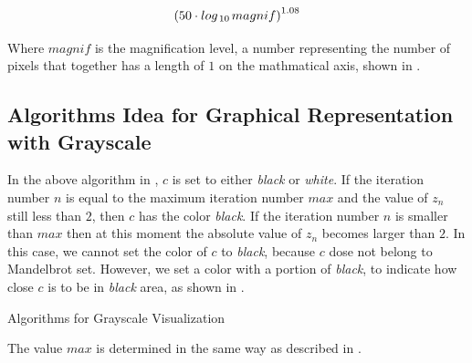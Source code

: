 \begin{equation}
    \label{eq:max}
    {(50 \cdot log_{\thinspace 10 \thinspace}{magnif})}^{1.08}
\end{equation}

Where $magnif$ is the magnification level, a number representing the number of pixels that together has a length of $1$ on the mathmatical axis, shown in .

\subsection*{Algorithms Idea for Graphical Representation with Grayscale}

In the above algorithm in , $c$ is set to either \emph{black} or \emph{white}. If the iteration number $n$ is equal to the maximum iteration number $max$ and the value of $z_n$ still less than $2$, then $c$ has the color \emph{black}. If the iteration number $n$ is smaller than $max$ then at this moment the absolute value of $z_n$ becomes larger than $2$. In this case, we cannot set the color of $c$ to \emph{black}, because $c$ dose not belong to Mandelbrot set. However, we set a color with a portion of \emph{black}, to indicate how close $c$ is to be in \emph{black} area, as shown in .

\begin{algorithm}[H]
    \caption{Algorithms for Grayscale Visualization}
    \label{alg:grayscale}
\end{algorithm}

The value $max$ is determined in the same way as described in .